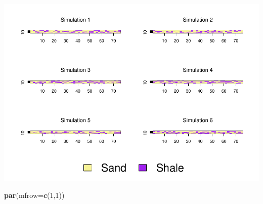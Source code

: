 \documentclass[
]{article}
\newenvironment{Shaded}{\begin{snugshade}}{\end{snugshade}}
\newcommand{\DataTypeTok}[1]{\textcolor[rgb]{0.13,0.29,0.53}{#1}}
\newcommand{\DecValTok}[1]{\textcolor[rgb]{0.00,0.00,0.81}{#1}}
\newcommand{\KeywordTok}[1]{\textcolor[rgb]{0.13,0.29,0.53}{\textbf{#1}}}
\newcommand{\NormalTok}[1]{#1}
\begin{document}
\includegraphics{Ex3_files/figure-latex/unnamed-chunk-5-1.pdf}

\begin{Shaded}
\begin{Highlighting}[]
\KeywordTok{par}\NormalTok{(}\DataTypeTok{mfrow=}\KeywordTok{c}\NormalTok{(}\DecValTok{1}\NormalTok{,}\DecValTok{1}\NormalTok{))}
\end{Highlighting}
\end{Shaded}
\end{document}
